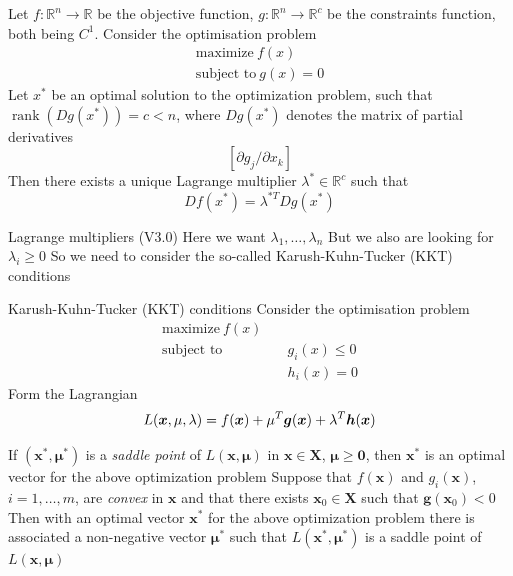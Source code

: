 \documentclass[aspectratio=169]{beamer}\usepackage[]{graphicx}\usepackage[]{xcolor}
\begin{document}
\begin{frame}
    \begin{theorem}
        Let $f\colon\mathbb{R}^n \rightarrow \mathbb{R}$ be the objective function, $g\colon\mathbb{R}^n \rightarrow \mathbb{R}^c $ be the constraints function, both being $C^1$.
        Consider the optimisation problem
        \begin{align*}
            \text{maximize}\ f(x) \\
            \text{subject to}\ g(x) = 0                 
        \end{align*}
        Let $x^*$ be an optimal solution to the optimization problem, such that $\operatorname{rank} (Dg(x^*)) = c < n$, where $Dg(x^*)$ denotes the matrix of partial derivatives
        \[
            \left[{\partial g_j}/{\partial x_k}\right]  
        \]
        Then there exists a unique Lagrange multiplier $\lambda^* \in \mathbb{R}^c$ such that
        \[
            Df(x^*) = \lambda^{*T}Dg(x^*)
        \]
    \end{theorem}
\end{frame}

\begin{frame}{Lagrange multipliers (V3.0)}
    Here we want $\lambda_1,\ldots,\lambda_n$
    \vfill
    But we also are looking for $\lambda_i\geq 0$
    \vfill 
    So we need to consider the so-called Karush-Kuhn-Tucker (KKT) conditions
\end{frame}

\begin{frame}{Karush-Kuhn-Tucker (KKT) conditions}
    Consider the optimisation problem
    \begin{align*}
        \text{maximize}\ f(x) \\
        \text{subject to}& \quad g_i(x) \leq 0  \\
        &\quad h_i(x)=0               
    \end{align*}
    Form the Lagrangian
    \[
        L(\bm{x},\mu,\lambda) = f(\bm{x})+\mu^T\bm{g}(\bm{x})+\lambda^T\bm{h}(\bm{x})
    \]
\end{frame}

\begin{frame}
    \begin{theorem}
        If $(\mathbf{x}^{\ast},\mathbf{\mu}^\ast)$ is a \emph{saddle point} of $L(\mathbf{x},\mathbf{\mu})$ in $\mathbf{x} \in \mathbf{X}$, $\mathbf{\mu} \geq \mathbf{0}$, then $\mathbf{x}^{\ast}$ is an optimal vector for the above optimization problem
        \vskip0.3cm
        Suppose that $f(\mathbf{x})$ and $g_i(\mathbf{x})$, $i = 1, \ldots, m$, are \emph{convex} in $\mathbf{x}$ and that there exists $\mathbf{x}_{0} \in \mathbf{X}$ such that $\mathbf{g}(\mathbf{x}_{0}) < 0$
        \vskip0.3cm
        Then with an optimal vector $\mathbf{x}^{\ast}$ for the above optimization problem there is associated a non-negative vector $\mathbf{\mu}^\ast$ such that $L(\mathbf{x}^{\ast},\mathbf{\mu}^\ast)$ is a saddle point of $L(\mathbf{x},\mathbf{\mu})$
    \end{theorem}
\end{frame}
\end{document}
